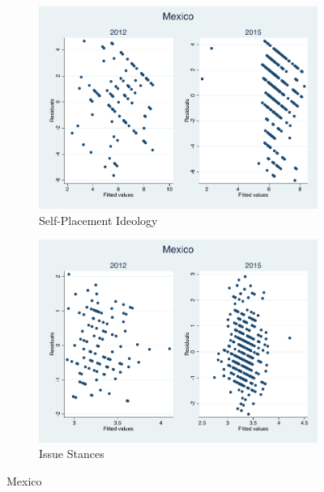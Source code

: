 \documentclass[12pt, titlepage]{article}
\begin{document}
\begin{figure}[H]
	\centering
	\begin{subfigure}[b]{0.475\textwidth}   
		\centering 
		\includegraphics[width=\textwidth]{Residuals/CountryIdeo/Mexico}
		\caption{Self-Placement Ideology}
	\end{subfigure}
	\hfill
	\begin{subfigure}[b]{0.475\textwidth}
		\centering 
		\includegraphics[width=\textwidth]{Residuals/CountryLib/Mexico}
		\caption{Issue Stances}
	\end{subfigure}
	\caption{Mexico}
	\label{Mexico}
\end{figure}
\end{document}
